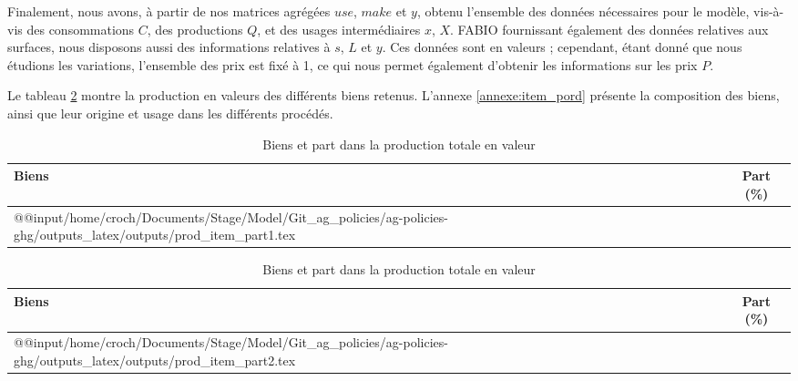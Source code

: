 Finalement, nous avons, à partir de nos matrices agrégées $use$, $make$ et $y$, obtenu l'ensemble des données nécessaires pour le modèle, vis-à-vis des consommations $C$, des productions $Q$, et des usages intermédiaires $x$, $X$. FABIO fournissant également des données relatives aux surfaces, nous disposons aussi des informations relatives à $s$, $L$ et $y$. Ces données sont en valeurs ; cependant, étant donné que nous étudions les variations, l'ensemble des prix est fixé à 1, ce qui nous permet également d'obtenir les informations sur les prix $P$.

Le tableau \ref{tab:prod_item} montre la production en valeurs des différents biens retenus. L'annexe \ref{annexe:item_pord} présente la composition des biens, ainsi que leur origine et usage dans les différents procédés.


\begin{table}[h!]
    \centering
    \caption{Biens et part dans la production totale en valeur}
    \label{tab:prod_item}
    \begin{threeparttable}
        \begin{minipage}[t]{0.49\textwidth}
            \centering
            \begin{tabularx}{\textwidth}{p{1.8in}c}
                \hline
                \textbf{Biens} & \textbf{Part} (\%) \\ \hline
                \csname @@input\endcsname /home/croch/Documents/Stage/Model/Git_ag_policies/ag-policies-ghg/outputs_latex/outputs/prod_item_part1.tex
                \hline
            \end{tabularx}
        \end{minipage}
        \begin{minipage}[t]{0.49\textwidth}
            \centering
            \begin{tabularx}{\textwidth}{p{2in}c}
                \hline
                \textbf{Biens} & \textbf{Part} (\%)                                                                                                   \\ \hline
                \csname @@input\endcsname /home/croch/Documents/Stage/Model/Git_ag_policies/ag-policies-ghg/outputs_latex/outputs/prod_item_part2.tex \\
                \hline
            \end{tabularx}
        \end{minipage}
    \end{threeparttable}
\end{table}

